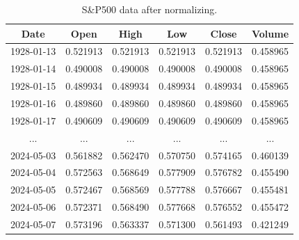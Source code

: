 \begin{table}[H]
	\centering
	\caption{S\&P500 data after normalizing.}
	\begin{tabular}{|c|c|c|c|c|c|}
		\hline
		\textbf{Date} & \textbf{Open} & \textbf{High} & \textbf{Low} & \textbf{Close} & \textbf{Volume} \\
		\hline
		1928-01-13    & 0.521913      & 0.521913      & 0.521913     & 0.521913       & 0.458965        \\
		\hline
		1928-01-14    & 0.490008      & 0.490008      & 0.490008     & 0.490008       & 0.458965        \\
		\hline
		1928-01-15    & 0.489934      & 0.489934      & 0.489934     & 0.489934       & 0.458965        \\
		\hline
		1928-01-16    & 0.489860      & 0.489860      & 0.489860     & 0.489860       & 0.458965        \\
		\hline
		1928-01-17    & 0.490609      & 0.490609      & 0.490609     & 0.490609       & 0.458965        \\
		\hline
		...           & ...           & ...           & ...          & ...            & ...             \\
		\hline
		2024-05-03    & 0.561882      & 0.562470      & 0.570750     & 0.574165       & 0.460139        \\
		\hline
		2024-05-04    & 0.572563      & 0.568649      & 0.577909     & 0.576782       & 0.455490        \\
		\hline
		2024-05-05    & 0.572467      & 0.568569      & 0.577788     & 0.576667       & 0.455481        \\
		\hline
		2024-05-06    & 0.572371      & 0.568490      & 0.577668     & 0.576552       & 0.455472        \\
		\hline
		2024-05-07    & 0.573196      & 0.563337      & 0.571300     & 0.561493       & 0.421249        \\
		\hline
	\end{tabular}
	\label{tab:nor2-data}
\end{table}


